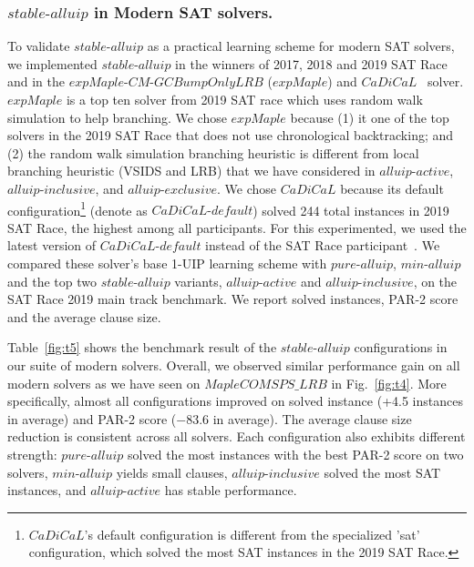 \documentclass[runningheads]{llncs}
\newcommand{\oneuip}{1-UIP\xspace}
\newcommand{\stablealluip}{\textit{stable-alluip}\xspace}
\newcommand{\allUipPure}{\textit{pure-alluip}\xspace}
\newcommand{\allUipMin}{\textit{min-alluip}\xspace}
\newcommand{\allUipAct}{\textit{alluip-active}}
\newcommand{\allUipIn}{\textit{alluip-inclusive}}
\newcommand{\allUipEx}{\textit{alluip-exclusive}}
\newcommand{\MapleBase}{\textit{MapleCOMSPS\_LRB}}
\newcommand{\expSAT}{\textit{expMaple-CM-GCBumpOnlyLRB} }
\newcommand{\expSATShort}{\textit{expMaple} }
\newcommand{\cadical}{\textit{CaDiCaL}}
\newcommand{\defaultcadical}{\textit{CaDiCaL-default}}
\begin{document}
\subsubsection{$\stablealluip$ in Modern SAT solvers.}
\begin{sloppypar}
To validate $\stablealluip$ as a practical learning scheme for modern
SAT solvers, we implemented $\stablealluip$ in the winners of 2017,
2018 and 2019 SAT Race
\cite{DBLP:conf/ijcai/LuoLXML17,ryvchin2018maple,Stepan2019MapleLCMDistChronoBT}
and in the $\expSAT$ \cite{MdSolimul2019expMalpe} ($\expSATShort$)
and $\cadical$~\cite{cadical} solver. $\expSATShort$ is a top ten solver from 2019 SAT race which
uses random walk simulation to help branching. We chose $\expSATShort$
because (1) it one of the top solvers in the 2019 SAT Race that does
not use chronological backtracking; and (2) the random walk simulation
branching heuristic is different from local branching heuristic (VSIDS
and LRB) that we have considered in $\allUipAct$, $\allUipIn$, and
$\allUipEx$. We chose $\cadical$ because its default configuration\footnote{$\cadical$'s default configuration is different from the specialized 'sat' configuration, which solved the most SAT instances in the 2019 SAT Race.} (denote as $\defaultcadical$) solved 244 total instances in 2019 SAT Race, the highest among all participants. For this experimented, we used the latest version of $\defaultcadical$ instead of the SAT Race participant~\cite{Armin2019Cadical}.  We compared these solver's base \oneuip learning scheme
with $\allUipPure$, $\allUipMin$ and the top two $\stablealluip$
variants, $\allUipAct$ and $\allUipIn$, on the SAT Race 2019 main
track benchmark. We report solved instances, PAR-2 score and the
average clause size.
\end{sloppypar}

Table~\ref{fig:t5} shows the benchmark result of the $\stablealluip$
configurations in our suite of modern solvers. Overall, we observed
similar performance gain on all modern solvers as we have seen on
$\MapleBase$ in Fig.~\ref{fig:t4}. More specifically, almost all
configurations improved on solved instance (+4.5 instances in average)
and PAR-2 score ($-$83.6 in average).  The average clause size
reduction is consistent across all solvers. Each configuration also
exhibits different strength: $\allUipPure$ solved the most instances
with the best PAR-2 score on two solvers, $\allUipMin$ yields small
clauses, $\allUipIn$ solved the most SAT instances, and $\allUipAct$
has stable performance.
\end{document}
